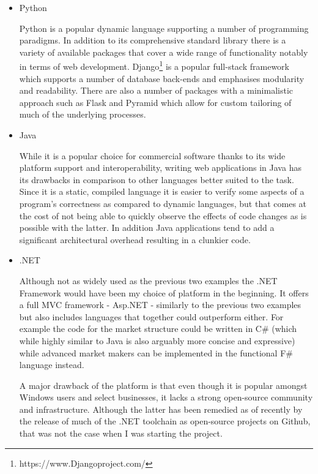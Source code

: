 \documentclass[bsc,frontabs,twoside,singlespacing,parskip,deptreport]{infthesis}     %
\begin{document}
\begin{itemize}
\item Python

Python is a popular dynamic language supporting a number of programming paradigms. In addition to its comprehensive standard library there is a variety of available packages that cover a wide range of functionality notably in terms of web development. Django\footnote{https://www.Djangoproject.com/} is a popular full-stack framework which supports a number of database back-ends and emphasises modularity and readability. There are also a number of packages with a minimalistic approach such as Flask and Pyramid which allow for custom tailoring of much of the underlying processes. 

\item Java

While it is a popular choice for commercial software thanks to its wide platform support and interoperability, writing web applications in Java has its drawbacks in comparison to other languages better suited to the task. Since it is a static, compiled language it is easier to verify some aspects of a program's correctness as compared to dynamic languages, but that comes at the cost of not being able to quickly observe the effects of code changes as is possible with the latter. In addition Java applications tend to add a significant architectural overhead resulting in a clunkier code. 

\item .NET

	Although not as widely used as the previous two examples the .NET Framework would have been my choice of platform in the beginning. It offers a full MVC framework - Asp.NET -  similarly to the previous two examples but also includes languages that together could outperform either. For example the code for the market structure could be written in C\# (which while highly similar to Java is also arguably more concise and expressive) while advanced market makers can be implemented in the functional F\# language instead. 

	A major drawback of the platform is that even though it is popular amongst Windows users and select businesses, it lacks a strong open-source community and infrastructure. Although the latter has been remedied as of recently by the release of much of the .NET toolchain as open-source projects on Github, that was not the case when I was starting the project. 

\end{itemize}
\end{document}

